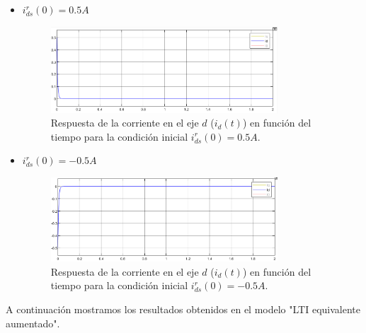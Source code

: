 \documentclass{article}
\begin{document}
\begin{itemize}
    \item $i^r_{ds}(0) = 0.5 A$
    
    \begin{figure}[H]
        \centering
        \includegraphics[width=0.8\textwidth]{5.1.6_cid1.png}
        \caption{Respuesta de la corriente en el eje $d$ ($i_d(t)$) en función del tiempo para la condición inicial $i^r_{ds}(0) = 0.5 A$.}
    \end{figure}

    \item $i^r_{ds}(0) = -0.5 A$
    
    \begin{figure}[H]
        \centering
        \includegraphics[width=0.8\textwidth]{5.1.6_cid2.png}
        \caption{Respuesta de la corriente en el eje $d$ ($i_d(t)$) en función del tiempo para la condición inicial $i^r_{ds}(0) = -0.5 A$.}
    \end{figure}
\end{itemize}

A continuación mostramos los resultados obtenidos en el modelo "LTI equivalente aumentado".
\end{document}
